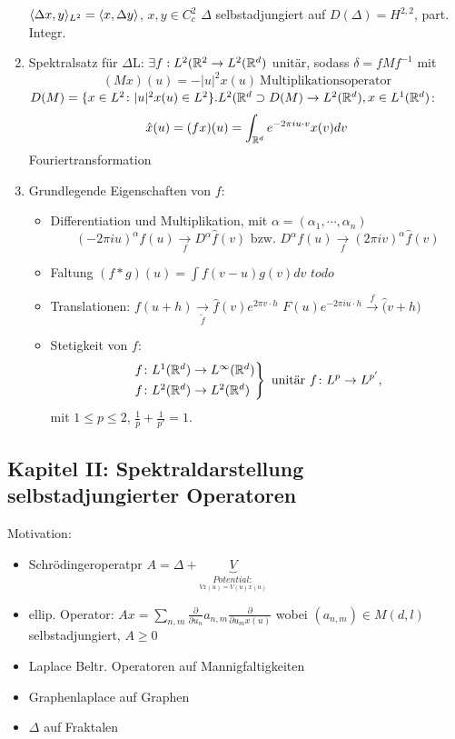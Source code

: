 \begin{enumerate}[label=\alph*\upshape)]
		$\langle \Delta x , y \rangle_{L^{2}} = \langle x , \Delta y \rangle$, $x, y \in C_{c}^{2}$ $\Delta$ selbstadjungiert auf $D(\Delta) = H^{2, 2}$, part. Integr.
	\item Spektralsatz für $\Delta$L: $\exists f: L^{2}(\mathbb{R}^{2} \rightarrow L^{2}(\mathbb{R}^{d})$ unitär, sodass $\delta = f M f^{-1}$ mit
			\[ (M x)(u) = - | u|^{2} x(u) ~ \text{Multiplikationsoperator} \]
		$D(M) = \{ x \in L^{2} \colon | u|^{2} x(u) \in L^{2} \}. L^{2}(\mathbb{R}^{d} \supset D(M) \rightarrow L^{2}(\mathbb{R}^{d}), x \in L^{1}(\mathbb{R}^{d})$:
	 		\[ \hat x (u) = (f x)(u) = \int_{\mathbb{R}^{d}} e^{-2 \pi i u \cdot v} x(v) dv \]
	  	Fouriertransformation
	\item Grundlegende Eigenschaften von $f$:
		\begin{itemize}
			\item Differentiation und Multiplikation, mit $\alpha = (\alpha_{1}, \cdots, \alpha_{n})$
				\[ (- 2 \pi i u)^{\alpha} f(u) \xrightarrow[f]{} D^{\alpha} \hat f(v) \text{ bzw. } D^{\alpha} f(u) \xrightarrow[f]{} (2 \pi i v)^{\alpha} \hat f(v)\]
			\item Faltung
				$( f \ast g)(u) = \int f(v - u) g(v) dv$
				$todo$ %
			\item Translationen: $f(u + h ) \xrightarrow[\tilde f]{} \hat f(v) e^{2 \pi v \cdot h}$
				$F(u) e^{- 2 \pi i u \cdot h} \xrightarrow[]{f} \hat(v + h)$
			\item Stetigkeit von $f$: 
				\[ \begin{rcases} f \colon L^{1}(\mathbb{R}^{d}) \rightarrow L^{\infty}(\mathbb{R}^{d}) \\ f \colon L^{2} (\mathbb{R}^{d}) \rightarrow L^{2}(\mathbb{R}^{d}) \end{rcases} \text{ unitär } f \colon L^{p} \rightarrow L^{p'}, \]
				mit $ 1 \leq p \leq 2$, $\frac{1}{p} + \frac{1}{p'} = 1$.
		\end{itemize}
\end{enumerate}


\subsection*{Kapitel II: Spektraldarstellung selbstadjungierter Operatoren}

Motivation: 
\begin{itemize}
	\item Schrödingeroperatpr $A = \Delta + \underbrace{V}_{\underset{V x(u) = V(u) x(u)}{Potential:}}$
	\item ellip. Operator: $A x = \sum_{n, m} \frac{\partial}{\partial u_{n}} a_{n, m} \frac{\partial}{\partial u_{m} x(u)}$ wobei $(a_{n, m}) \in M(d, l)$ selbstadjungiert, $A \geq 0$
	\item Laplace Beltr. Operatoren auf Mannigfaltigkeiten
	\item Graphenlaplace auf Graphen
	\item $\Delta$ auf Fraktalen
\end{itemize}

